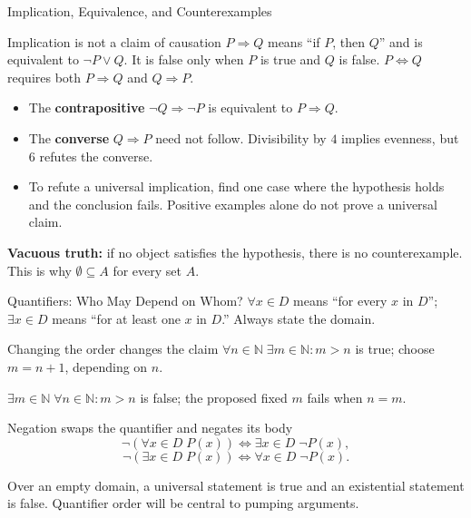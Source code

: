 \documentclass[10pt]{beamer}
\begin{document}
\begin{frame}{Implication, Equivalence, and Counterexamples}
  \small
  \begin{block}{Implication is not a claim of causation}
    $P\Rightarrow Q$ means ``if $P$, then $Q$'' and is equivalent to
    $\neg P\vee Q$. It is false only when $P$ is true and $Q$ is false.
    $P\Leftrightarrow Q$ requires both $P\Rightarrow Q$ and $Q\Rightarrow P$.
  \end{block}
  \pause
  \begin{itemize}
    \item The \textbf{contrapositive} $\neg Q\Rightarrow\neg P$ is equivalent
      to $P\Rightarrow Q$.
    \item The \textbf{converse} $Q\Rightarrow P$ need not follow.
      Divisibility by $4$ implies evenness, but $6$ refutes the converse.
    \item To refute a universal implication, find one case where the
      hypothesis holds and the conclusion fails. Positive examples alone
      do not prove a universal claim.
  \end{itemize}
  \pause
  \textbf{Vacuous truth:} if no object satisfies the hypothesis, there is
  no counterexample. This is why $\emptyset\subseteq A$ for every set $A$.
\end{frame}

\begin{frame}{Quantifiers: Who May Depend on Whom?}
  \small
  $\forall x\in D$ means ``for every $x$ in $D$'';
  $\exists x\in D$ means ``for at least one $x$ in $D$.''
  Always state the domain.
  \begin{exampleblock}{Changing the order changes the claim}
    $\forall n\in\mathbb{N}\;\exists m\in\mathbb{N}:m>n$ is true;
    choose $m=n+1$, depending on $n$.
    \par\smallskip
    $\exists m\in\mathbb{N}\;\forall n\in\mathbb{N}:m>n$ is false;
    the proposed fixed $m$ fails when $n=m$.
  \end{exampleblock}
  \pause
  \begin{block}{Negation swaps the quantifier and negates its body}
    \[
      \neg(\forall x\in D\;P(x))\iff\exists x\in D\;\neg P(x),
    \]
    \[
      \neg(\exists x\in D\;P(x))\iff\forall x\in D\;\neg P(x).
    \]
  \end{block}
  Over an empty domain, a universal statement is true and an existential
  statement is false. Quantifier order will be central to pumping arguments.
\end{frame}
\end{document}
